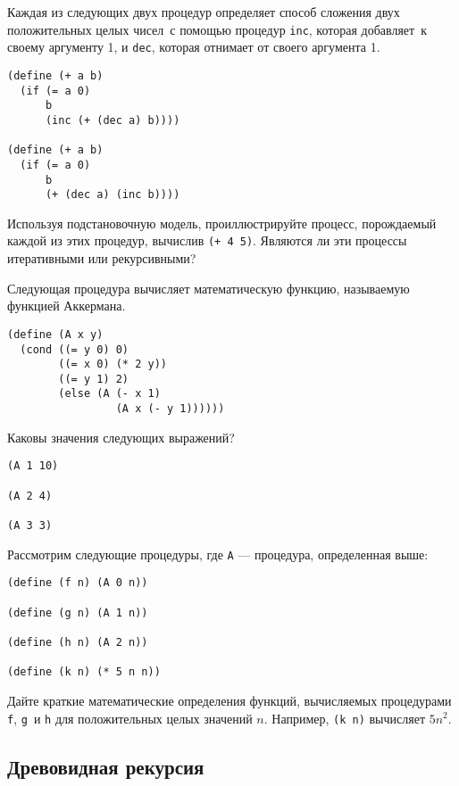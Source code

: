 \begin{exercise}{1.9}\label{EX1.9}%
Каждая из следующих двух процедур определяет способ
сложения двух положительных целых чисел~с помощью процедур
{\tt inc}, которая добавляет~к своему аргументу 1, и
{\tt dec}, которая отнимает от своего аргумента 1.

\begin{Verbatim}[fontsize=\small]
(define (+ a b)
  (if (= a 0)
      b
      (inc (+ (dec a) b))))

(define (+ a b)
  (if (= a 0)
      b
      (+ (dec a) (inc b))))
\end{Verbatim}
Используя подстановочную модель, проиллюстрируйте процесс, порождаемый 
каждой из этих процедур, вычислив {\tt (+ 4 5)}. Являются ли
эти процессы итеративными или рекурсивными?
\end{exercise}
\begin{exercise}{1.10}\label{EX1.10}%
Следующая процедура вычисляет математическую функцию,
называемую функцией Аккермана.

\begin{Verbatim}[fontsize=\small]
(define (A x y)
  (cond ((= y 0) 0)
        ((= x 0) (* 2 y))
        ((= y 1) 2)
        (else (A (- x 1)
                 (A x (- y 1))))))
\end{Verbatim}
Каковы значения следующих выражений?

\begin{Verbatim}[fontsize=\small]
(A 1 10)

(A 2 4)

(A 3 3)
\end{Verbatim}
Рассмотрим следующие процедуры, где {\tt A} --- процедура,
определенная выше:

\begin{Verbatim}[fontsize=\small]
(define (f n) (A 0 n))

(define (g n) (A 1 n))

(define (h n) (A 2 n))

(define (k n) (* 5 n n))
\end{Verbatim}
Дайте краткие математические определения функций, вычисляемых
процедурами {\tt f}, {\tt g}~и {\tt h} для
положительных целых значений $n$. Например, {\tt (k
n)} вычисляет $5n^2$.
\end{exercise}

\subsection{Древовидная рекурсия}
\label{TREE-RECURSION}


